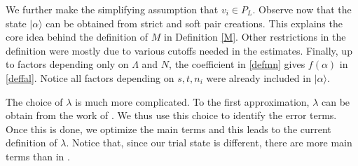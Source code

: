 \documentclass[11pt]{article}
\numberwithin{equation}{section}
\newcommand\al{{\alpha}}
\renewcommand\rho\varrho
\theoremstyle{definition}
\begin{document}
We  further make  the simplifying  assumption that $v_i \in P_L$.  
Observe now that the state $|\al\rangle$ can be obtained from strict and soft pair creations. This explains the core  idea behind the definition of  $M$ in Definition \ref{M}. Other restrictions in the definition were mostly due to various cutoffs needed in the estimates. 
Finally, up to factors depending only on $\Lambda$ and $N$, the coefficient  in \eqref{defmn} gives $f(\alpha)$ in \eqref{deffal}. Notice all factors depending on $s, t, n_i$ were already included in $|\alpha\rangle $.




The choice of $\lambda$ is much more complicated. To the first approximation, $\lambda$ can be obtain
from the work of \cite{ESY}. We thus use this choice to identify the error terms.  Once this is done, we
optimize the main terms and this leads to the current definition of $\lambda$. Notice that, since our trial state
is different, there are more main terms than in \cite{ESY}.

\end{document}
